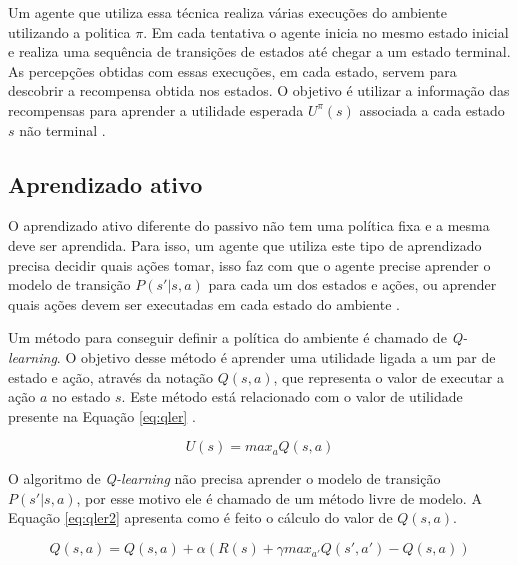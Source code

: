 Um agente que utiliza essa técnica realiza várias execuções do ambiente utilizando a politica $\pi$. Em cada tentativa o agente inicia no mesmo estado inicial e realiza uma sequência de transições de estados até chegar a um estado terminal. As percepções obtidas com essas execuções, em cada estado, servem para descobrir a recompensa obtida nos estados. O objetivo é utilizar a informação das recompensas para aprender a utilidade esperada $U^{\pi}(s)$ associada a cada estado $s$ não terminal \cite{intelligence2003modern}. 

\subsection{Aprendizado ativo}

O aprendizado ativo diferente do passivo não tem uma política fixa e a mesma deve ser aprendida. Para isso, um agente que utiliza este tipo de aprendizado precisa decidir quais ações tomar, isso faz com que o agente precise aprender o modelo de transição $P(s' | s, a)$ para cada um dos estados e ações, ou aprender quais ações devem ser executadas em cada estado do ambiente \cite{intelligence2003modern}. 

Um método para conseguir definir a política do ambiente é chamado de \textit{Q-learning}. O objetivo desse método é aprender uma utilidade ligada a um par de estado e ação, através da notação $Q(s, a)$, que representa o valor de executar a ação $a$ no estado $s$. Este método está relacionado com o valor de utilidade presente na Equação \ref{eq:qler} \cite{intelligence2003modern}.

\begin{equation}
\label{eq:qler}	
	U(s) =  max_{a} Q(s, a)
\end{equation}

O algoritmo de \textit{Q-learning} não precisa aprender o modelo de transição $P(s' | s, a)$, por esse motivo ele é chamado de um método livre de modelo. A Equação \ref{eq:qler2} apresenta como é feito o cálculo do valor de $Q(s, a)$.

\begin{equation}
\label{eq:qler2}	
Q(s, a) = Q(s, a) + \alpha (R(s) + \gamma max_{a'} Q(s', a') - Q(s, a))
\end{equation}

